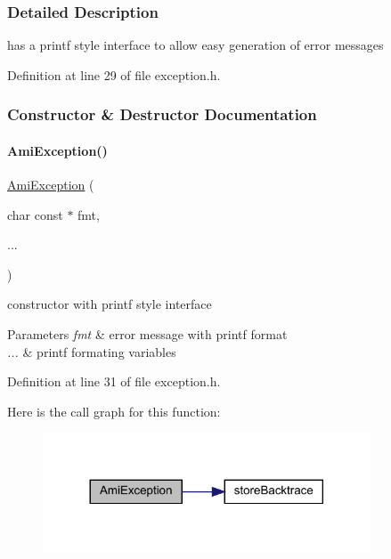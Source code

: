 \subsubsection{Detailed Description}
has a printf style interface to allow easy generation of error messages 

Definition at line 29 of file exception.\+h.



\subsubsection{Constructor \& Destructor Documentation}
\mbox{\label{classamici_1_1_ami_exception_a002ee872acedd472df0550357a67393c}} 
\paragraph{\texorpdfstring{AmiException()}{AmiException()}\hspace{0.1cm}{\footnotesize\ttfamily [1/2]}}
{\footnotesize\ttfamily \mbox{\hyperlink{classamici_1_1_ami_exception}{Ami\+Exception}} (\begin{DoxyParamCaption}\item[{char const $\ast$}]{fmt,  }\item[{}]{... }\end{DoxyParamCaption})}

constructor with printf style interface 
\begin{DoxyParams}{Parameters}
{\em fmt} & error message with printf format \\
\hline
{\em ...} & printf formating variables\\
\hline
\end{DoxyParams}


Definition at line 31 of file exception.\+h.

Here is the call graph for this function\+:
\nopagebreak
\begin{figure}[H]
\begin{center}
\leavevmode
\includegraphics[width=276pt]{classamici_1_1_ami_exception_a002ee872acedd472df0550357a67393c_cgraph}
\end{center}
\end{figure}
\mbox{\label{classamici_1_1_ami_exception_a0e9ee88cdcbd1965e44d2d94cc6eb16e}} 
